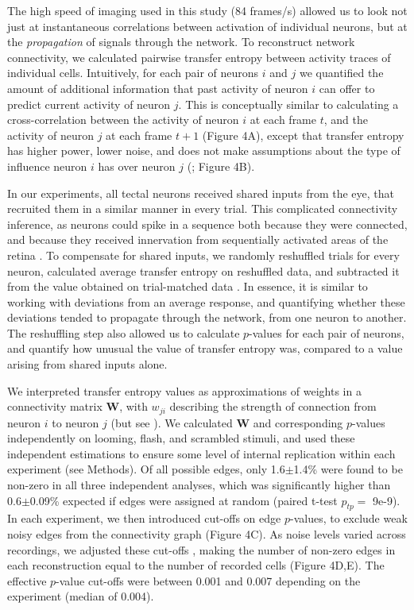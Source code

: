 \documentclass{article}
\begin{document}
The high speed of imaging used in this study (84 frames/s) allowed us to look not just at instantaneous correlations between activation of individual neurons, but at the \textit{propagation} of signals through the network. To reconstruct network connectivity, we calculated pairwise transfer entropy \citep{gourevitch2007te, stetter2012te} between activity traces of individual cells. Intuitively, for each pair of neurons $i$ and $j$ we quantified the amount of additional information that past activity of neuron $i$ can offer to predict current activity of neuron $j$. This is conceptually similar to calculating a cross-correlation between the activity of neuron $i$ at each frame $t$, and the activity of neuron $j$ at each frame $t+1$ (Figure 4A), except that transfer entropy has higher power, lower noise, and does not make assumptions about the type of influence neuron $i$ has over neuron $j$ (\citealt{stetter2012te}; Figure 4B).

In our experiments, all tectal neurons received shared inputs from the eye, that recruited them in a similar manner in every trial. This complicated connectivity inference, as neurons could spike in a sequence both because they were connected, and because they received innervation from sequentially activated areas of the retina \citep{mehler2018lure}. To compensate for shared inputs, we randomly reshuffled trials for every neuron, calculated average transfer entropy on reshuffled data, and subtracted it from the value obtained on trial-matched data \citep{gourevitch2007te, wollstadt2014te}. In essence, it is similar to working with deviations from an average response, and quantifying whether these deviations tended to propagate through the network, from one neuron to another. The reshuffling step also allowed us to calculate $p$-values for each pair of neurons, and quantify how unusual the value of transfer entropy was, compared to a value arising from shared inputs alone.

We interpreted transfer entropy values as approximations of weights in a connectivity matrix $\textbf{W}$, with $w_{ji}$ describing the strength of connection from neuron $i$ to neuron $j$ (but see \citealt{mehler2018lure}). We calculated $\textbf{W}$ and corresponding $p$-values independently on looming, flash, and scrambled stimuli, and used these independent estimations to ensure some level of internal replication within each experiment (see Methods). Of all possible edges, only 1.6$\pm$1.4\% were found to be non-zero in all three independent analyses, which was significantly higher than 0.6$\pm$0.09\% expected if edges were assigned at random (paired t-test $p_{tp}=$ 9e-9). In each experiment, we then introduced cut-offs on edge $p$-values, to exclude weak noisy edges from the connectivity graph (Figure 4C). As noise levels varied across recordings, we adjusted these cut-offs \citep{stetter2012te}, making the number of non-zero edges in each reconstruction equal to the number of recorded cells (Figure 4D,E). The effective $p$-value cut-offs were between 0.001 and 0.007 depending on the experiment (median of 0.004).
\end{document}
